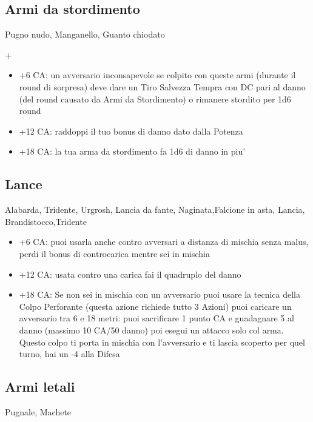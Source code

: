 \documentclass[a4paper,11pt,twoside,openany]{book}
\begin{document}
	\subsection{Armi da stordimento} Pugno nudo, Manganello, Guanto chiodato
	
	+\begin{itemize}
		\item +6 CA: un avversario inconsapevole se colpito con queste armi (durante il round di sorpresa) deve dare un Tiro Salvezza Tempra con DC pari al danno (del round causato da Armi da Stordimento) o rimanere stordito per 1d6 round
		
		\item +12 CA: raddoppi il tuo bonus di danno dato dalla Potenza
		
		\item +18 CA: la tua arma da stordimento fa 1d6 di danno in piu'
	\end{itemize}
	
	\subsection{Lance} Alabarda, Tridente, Urgrosh, Lancia da fante, Naginata,Falcione in asta, Lancia, Brandistocco,Tridente
	
	\begin{itemize}
		\item +6 CA: puoi usarla anche contro avversari a distanza di mischia senza malus, perdi il bonus di controcarica mentre sei in mischia
		
		\item +12 CA: usata contro una carica fai il quadruplo del danno
		
		\item +18 CA: Se non sei in mischia con un avversario puoi usare la tecnica della Colpo Perforante (questa azione richiede tutto 3 Azioni) puoi caricare un avversario tra 6 e 18 metri: puoi sacrificare 1 punto CA e guadagnare 5 al danno (massimo 10 CA/50 danno) poi esegui un attacco solo col arma. Questo colpo ti porta in mischia con l'avversario e ti lascia scoperto per quel turno, hai un -4 alla Difesa
		
	\end{itemize}
	
	\subsection{Armi letali} Pugnale, Machete
	
\end{document}
